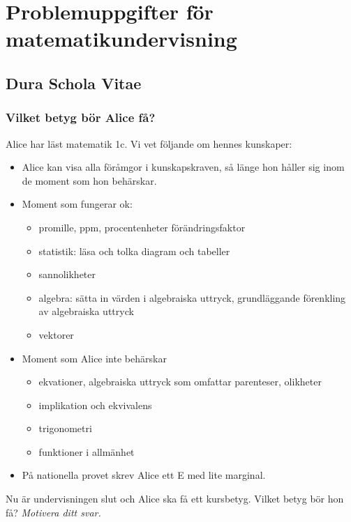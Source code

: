 \part*{Problemuppgifter för matematikundervisning}

\chapter{Dura Schola Vitae}

\setcounter{section}{0}
\section{Vilket betyg bör Alice få?}
Alice har läst matematik 1c. Vi vet följande om hennes kunskaper:

\begin{itemize}
  \item Alice kan visa alla föråmgor i kunskapskraven, så länge hon håller sig inom de moment som hon behärskar.
  \item Moment som fungerar ok:
    \begin{itemize}
      \item promille, ppm, procentenheter förändringsfaktor
      \item statistik: läsa och tolka diagram och tabeller
      \item sannolikheter
      \item algebra: sätta in värden i algebraiska uttryck, grundläggande förenkling av algebraiska uttryck
      \item vektorer
    \end{itemize}
  \item Moment som Alice inte behärskar
    \begin{itemize}
      \item ekvationer, algebraiska uttryck som omfattar parenteser, olikheter
      \item implikation och ekvivalens
      \item trigonometri
      \item funktioner i allmänhet
    \end{itemize}
  \item På nationella provet skrev Alice ett E med lite marginal.
\end{itemize}

\noindent Nu är undervisningen slut och Alice ska få ett kursbetyg. Vilket betyg bör hon få? \em{Motivera ditt svar.}
